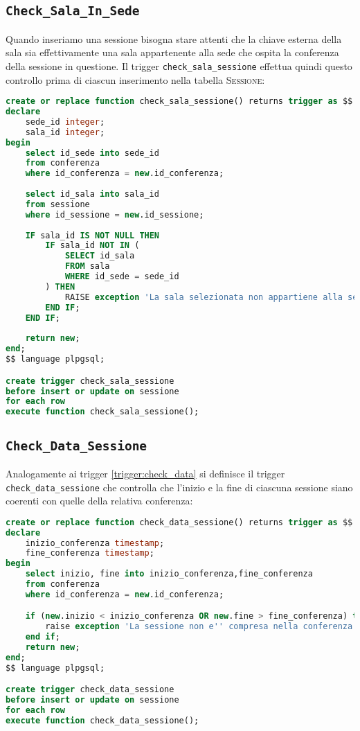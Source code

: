 \subsection{\texttt{Check\_Sala\_In\_Sede}}\label{trigger:salainsede}
Quando inseriamo una sessione bisogna stare attenti che la chiave esterna della sala sia effettivamente una sala appartenente alla sede che ospita la conferenza della sessione in questione. Il trigger \texttt{check\_sala\_sessione} effettua quindi questo controllo prima di ciascun inserimento nella tabella \textsc{Sessione}:
\begin{lstlisting}[language=SQL, style=mystyle]
create or replace function check_sala_sessione() returns trigger as $$
declare
    sede_id integer;
    sala_id integer;
begin
    select id_sede into sede_id
    from conferenza
    where id_conferenza = new.id_conferenza;
    
    select id_sala into sala_id
    from sessione
    where id_sessione = new.id_sessione;
    
    IF sala_id IS NOT NULL THEN
        IF sala_id NOT IN (
            SELECT id_sala
            FROM sala
            WHERE id_sede = sede_id
        ) THEN
            RAISE exception 'La sala selezionata non appartiene alla sede della conferenza';
        END IF;
    END IF;
    
    return new;
end;
$$ language plpgsql;

create trigger check_sala_sessione
before insert or update on sessione
for each row
execute function check_sala_sessione();
\end{lstlisting}
\subsection{\texttt{Check\_Data\_Sessione}}\label{trigger:datasessione}
Analogamente ai trigger \ref{trigger:check_data} si definisce il trigger \texttt{check\_data\_sessione} che controlla che l'inizio e la fine di ciascuna sessione siano coerenti con quelle della relativa conferenza:
\begin{lstlisting}[language=SQL, style=mystyle, caption={\texttt{check\_data\_sessione}}]
create or replace function check_data_sessione() returns trigger as $$
declare
    inizio_conferenza timestamp;
    fine_conferenza timestamp;
begin
    select inizio, fine into inizio_conferenza,fine_conferenza
    from conferenza
    where id_conferenza = new.id_conferenza;

    if (new.inizio < inizio_conferenza OR new.fine > fine_conferenza) then
        raise exception 'La sessione non e'' compresa nella conferenza';
    end if;
    return new;
end;
$$ language plpgsql;

create trigger check_data_sessione
before insert or update on sessione
for each row
execute function check_data_sessione();
\end{lstlisting}
